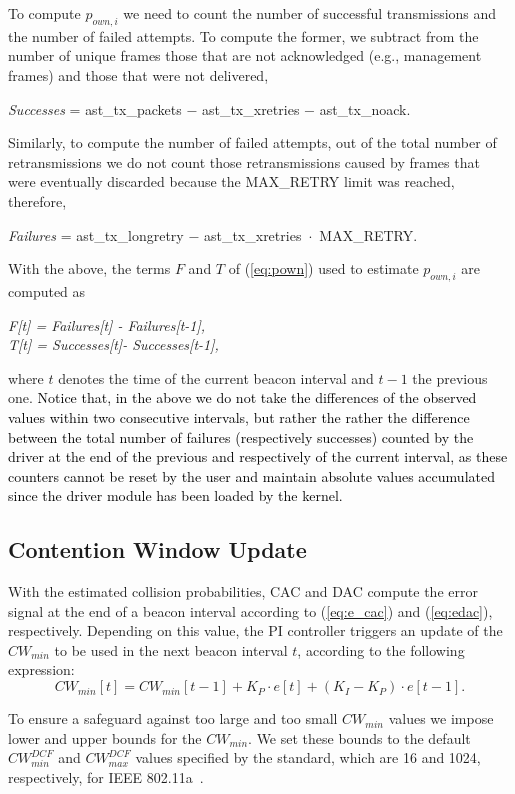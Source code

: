 \documentclass[a4paper,10pt]{article}
\newcommand{\revs}[1]{\textcolor{black}{#1}}
\begin{document}
To compute $p_{own,i}$ we need to count the number of successful transmissions and the number of failed attempts. To compute the former, we subtract from the number of unique frames those that are not acknowledged (e.g., management frames) and those that were not delivered,

\begin{center}
 \emph{Successes} = {\ttfamily ast\_tx\_packets $-$ ast\_tx\_xretries $-$ ast\_tx\_noack.}
\end{center}
Similarly, to compute the number of failed attempts, out of the total number of retransmissions we do not count those retransmissions caused by frames that were eventually discarded because the {\ttfamily MAX\_RETRY} limit was reached, therefore, 
\begin{center}
 \emph{Failures} = {\ttfamily ast\_tx\_longretry $-$ ast\_tx\_xretries~$\cdot$~MAX\_RETRY.}
\end{center}
With the above, the terms $F$ and $T$ of (\ref{eq:pown}) used to estimate $p_{own,i}$ are computed as
\begin{center}
\emph{
F[t] = Failures[t] - Failures[t-1], \\
T[t] = Successes[t]- Successes[t-1],}
\end{center}
where $t$ denotes the time of the current beacon interval and $t-1$ the previous one. \revs{Notice that, in the above we do not take the differences of the observed values within two consecutive intervals, but rather the rather the difference between the total number of failures (respectively successes) counted by the driver at the end of the previous and respectively of the current interval, as these counters cannot be reset by the user and maintain absolute values accumulated since the driver module has been loaded by the kernel.}


\subsection{Contention Window Update}
\label{sec:cw_update}
With the estimated collision probabilities, CAC and DAC compute the error signal at the end of a beacon interval according to (\ref{eq:e_cac}) and (\ref{eq:edac}), respectively. Depending on this value, the PI controller triggers an update of the $CW_{min}$ to be used in the next beacon interval $t$, according to the following expression:
\[CW_{min}[t] = CW_{min}[t - 1] + K_P \cdot e[t] + (K_I - K_P) \cdot e[t - 1].\]

To ensure a safeguard against too large and too small $CW_{min}$ values we impose lower and upper bounds for the $CW_{min}$. We set these bounds to the default $CW_{min}^{DCF}$ and $CW_{max}^{DCF}$ values specified by the standard, which are 16 and 1024, respectively, for IEEE 802.11a~\cite{80211A}.
\end{document}
